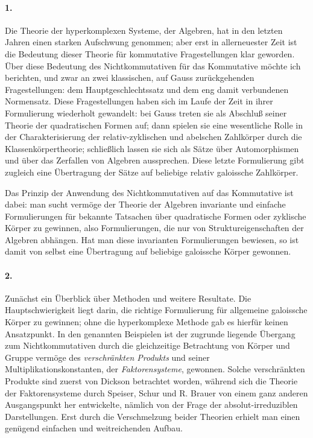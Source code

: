 \documentclass[11pt]{article}
\begin{document}
\paragraph{1.}
Die Theorie der hyperkomplexen Systeme, der Algebren, hat in den letzten Jahren einen starken Aufschwung genommen; aber erst in allerneuester Zeit ist die Bedeutung dieser Theorie für kommutative Fragestellungen klar geworden. Über diese Bedeutung des Nichtkommutativen für das Kommutative möchte ich berichten, und zwar an zwei klassischen, auf Gauss zurückgehenden Fragestellungen: dem Hauptgeschlechtssatz und dem eng damit verbundenen Normensatz. Diese Fragestellungen haben sich im Laufe der Zeit in ihrer Formulierung wiederholt gewandelt: bei Gauss treten sie als Abschluß seiner Theorie der quadratischen Formen auf; dann spielen sie eine wesentliche Rolle in der Charakterisierung der relativ-zyklischen und abelschen Zahlkörper durch die Klassenkörpertheorie; schließlich lassen sie sich als Sätze über Automorphismen und über das Zerfallen von Algebren aussprechen. Diese letzte Formulierung gibt zugleich eine Übertragung der Sätze auf beliebige relativ galoissche Zahlkörper.

Das Prinzip der Anwendung des Nichtkommutativen auf das Kommutative ist dabei: man sucht vermöge der Theorie der Algebren invariante und einfache Formulierungen für bekannte Tatsachen über quadratische Formen oder zyklische Körper zu gewinnen, also Formulierungen, die nur von Struktureigenschaften der Algebren abhängen. Hat man diese invarianten Formulierungen bewiesen, so ist damit von selbst eine Übertragung auf beliebige galoissche Körper gewonnen.

\paragraph{2.}
Zunächst ein Überblick über Methoden und weitere Resultate. Die Hauptschwierigkeit liegt darin, die richtige Formulierung für allgemeine galoissche Körper zu gewinnen; ohne die hyperkomplexe Methode gab es hierfür keinen Ansatzpunkt. In den genannten Beispielen ist der zugrunde liegende Übergang zum Nichtkommutativen durch die gleichzeitige Betrachtung von Körper und Gruppe vermöge des \emph{verschränkten Produkts} und seiner Multiplikationskonstanten, der \emph{Faktorensysteme}, gewonnen. Solche verschränkten Produkte sind zuerst von Dickson betrachtet worden, während sich die Theorie der Faktorensysteme durch Speiser, Schur und R. Brauer von einem ganz anderen Ausgangspunkt her entwickelte, nämlich von der Frage der absolut-irreduziblen Darstellungen. Erst durch die Verschmelzung beider Theorien erhielt man einen genügend einfachen und weitreichenden Aufbau.
\end{document}
